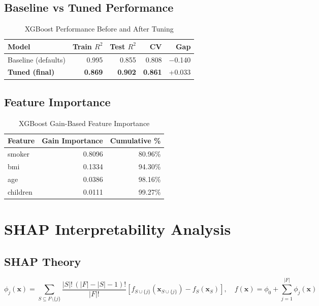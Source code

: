 \documentclass[12pt,a4paper]{report}
\begin{document}
\section{Baseline vs Tuned Performance}

\begin{table}[H]
\centering
\caption{XGBoost Performance Before and After Tuning}
\begin{tabular}{lrrrr}
\toprule
\textbf{Model} & \textbf{Train $R^2$} & \textbf{Test $R^2$} & \textbf{CV} & \textbf{Gap} \\
\midrule
Baseline (defaults)    & 0.995 & 0.855 & 0.808 & $-$0.140 \\
\textbf{Tuned (final)} & \textbf{0.869} & \textbf{0.902} & \textbf{0.861} & +0.033 \\
\bottomrule
\end{tabular}
\end{table}

\section{Feature Importance}

\begin{table}[H]
\centering
\caption{XGBoost Gain-Based Feature Importance}
\begin{tabular}{lrr}
\toprule
\textbf{Feature} & \textbf{Gain Importance} & \textbf{Cumulative \%} \\
\midrule
smoker   & 0.8096 & 80.96\% \\
bmi      & 0.1334 & 94.30\% \\
age      & 0.0386 & 98.16\% \\
children & 0.0111 & 99.27\% \\
\bottomrule
\end{tabular}
\end{table}

\chapter{SHAP Interpretability Analysis}

\section{SHAP Theory}

\begin{equation}
  \phi_j(\mathbf{x}) = \sum_{S \subseteq F \setminus \{j\}} \frac{|S|!\,(|F|-|S|-1)!}{|F|!}
  \left[ f_{S \cup \{j\}}(\mathbf{x}_{S \cup \{j\}}) - f_S(\mathbf{x}_S) \right], \quad
  f(\mathbf{x}) = \phi_0 + \sum_{j=1}^{|F|} \phi_j(\mathbf{x})
\end{equation}
\end{document}
